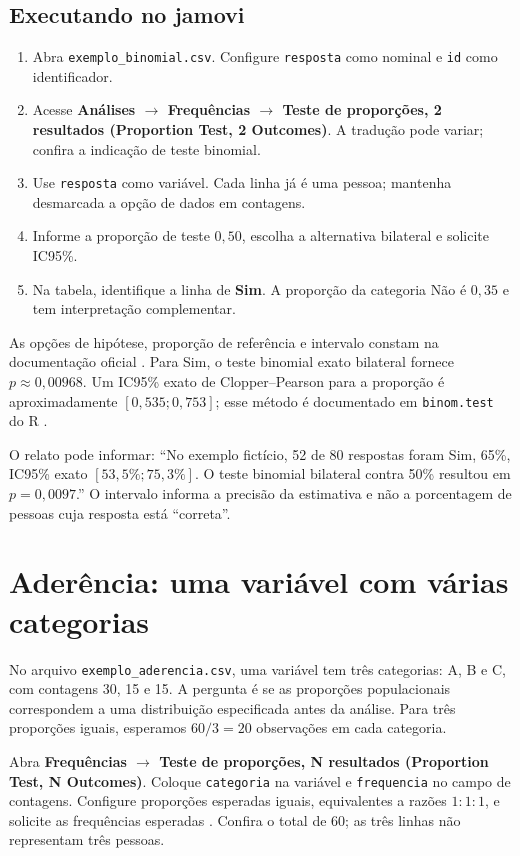 \subsection{Executando no jamovi}

\begin{enumerate}
  \item Abra \texttt{exemplo\_binomial.csv}. Configure \texttt{resposta} como nominal e \texttt{id} como identificador.
  \item Acesse \textbf{Análises $\rightarrow$ Frequências $\rightarrow$ Teste de proporções, 2 resultados (Proportion Test, 2 Outcomes)}. A tradução pode variar; confira a indicação de teste binomial.
  \item Use \texttt{resposta} como variável. Cada linha já é uma pessoa; mantenha desmarcada a opção de dados em contagens.
  \item Informe a proporção de teste $0{,}50$, escolha a alternativa bilateral e solicite IC95\%.
  \item Na tabela, identifique a linha de \textbf{Sim}. A proporção da categoria Não é $0{,}35$ e tem interpretação complementar.
\end{enumerate}

As opções de hipótese, proporção de referência e intervalo constam na documentação oficial \parencite{JamoviBinomial}. Para Sim, o teste binomial exato bilateral fornece $p\approx0{,}00968$. Um IC95\% exato de Clopper--Pearson para a proporção é aproximadamente $[0{,}535;0{,}753]$; esse método é documentado em \texttt{binom.test} do R \parencite{RBinomial}.

O relato pode informar: ``No exemplo fictício, 52 de 80 respostas foram Sim, 65\%, IC95\% exato $[53{,}5\%;75{,}3\%]$. O teste binomial bilateral contra 50\% resultou em $p=0{,}0097$.'' O intervalo informa a precisão da estimativa e não a porcentagem de pessoas cuja resposta está ``correta''.

\section{Aderência: uma variável com várias categorias}

No arquivo \texttt{exemplo\_aderencia.csv}, uma variável tem três categorias: A, B e C, com contagens 30, 15 e 15. A pergunta é se as proporções populacionais correspondem a uma distribuição especificada antes da análise. Para três proporções iguais, esperamos $60/3=20$ observações em cada categoria.

Abra \textbf{Frequências $\rightarrow$ Teste de proporções, N resultados (Proportion Test, N Outcomes)}. Coloque \texttt{categoria} na variável e \texttt{frequencia} no campo de contagens. Configure proporções esperadas iguais, equivalentes a razões $1:1:1$, e solicite as frequências esperadas \parencite{JamoviAderencia}. Confira o total de 60; as três linhas não representam três pessoas.

